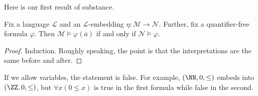 \documentclass[../notes.tex]{subfiles}
\begin{document}
Here is our first result of substance.
\begin{proposition}
	Fix a language $\mathcal L$ and an $\mathcal L$-embedding $\eta\colon\mathcal M\to\mathcal N$. Further, fix a quantifier-free formula $\varphi$. Then $\mathcal M\models\varphi(\overline a)$ if and only if $\mathcal N\models\varphi$.
\end{proposition}
\begin{proof}
	Induction. Roughly speaking, the point is that the interpretations are the same before and after.
\end{proof}
\begin{remark}
	If we allow variables, the statement is false. For example, $(\NN,0,\le)$ embeds into $(\ZZ,0,\le)$, but $\forall x(0\le x)$ is true in the first formula while false in the second.
\end{remark}
\end{document}
